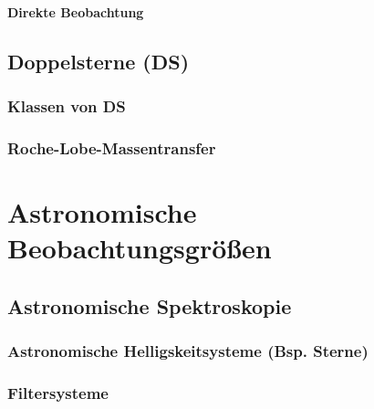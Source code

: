 \subsection{Direkte Beobachtung}

\chapter[Doppelsterne]{Doppelsterne (DS)}
\section{Klassen von DS}
\section{Roche-Lobe-Massentransfer}

\part{Astronomische Beobachtungsgrößen}
\chapter{Astronomische Spektroskopie}
\section[Astronomische Helligskeitsysteme]{Astronomische Helligskeitsysteme (Bsp. Sterne)}
\section{Filtersysteme}
